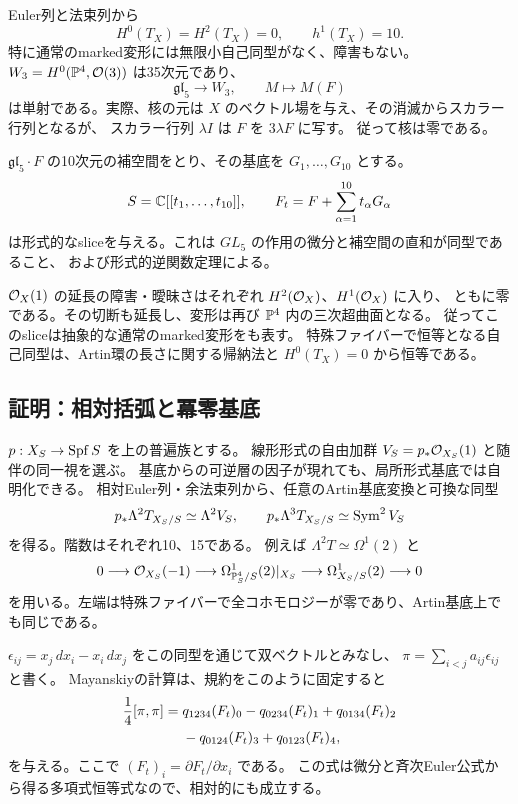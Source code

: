 Euler列と法束列から
\[
 H^0(T_X)=H^2(T_X)=0,\qquad h^1(T_X)=10.
\]
特に通常のmarked変形には無限小自己同型がなく、障害もない。
$W_3=H^0(\mathbb P^4,\mathcal O(3))$ は35次元であり、
\[
 \mathfrak{gl}_5\longrightarrow W_3,\qquad M\longmapsto M(F)
\]
は単射である。実際、核の元は $X$ のベクトル場を与え、その消滅からスカラー行列となるが、
スカラー行列 $\lambda I$ は $F$ を $3\lambda F$ に写す。
従って核は零である。

$\mathfrak{gl}_5\cdot F$ の10次元の補空間をとり、その基底を $G_1,\ldots,G_{10}$ とする。
\[
 S=\mathbb C[[t_1,\ldots,t_{10}]],\qquad
 F_t=F+\sum_{\alpha=1}^{10}t_\alpha G_\alpha
\]
は形式的なsliceを与える。これは $GL_5$ の作用の微分と補空間の直和が同型であること、
および形式的逆関数定理による。

$\mathcal O_X(1)$ の延長の障害・曖昧さはそれぞれ $H^2(\mathcal O_X)$、$H^1(\mathcal O_X)$ に入り、
ともに零である。その切断も延長し、変形は再び $\mathbb P^4$ 内の三次超曲面となる。
従ってこのsliceは抽象的な通常のmarked変形をも表す。
特殊ファイバーで恒等となる自己同型は、Artin環の長さに関する帰納法と
$H^0(T_X)=0$ から恒等である。

\subsection{証明：相対括弧と冪零基底}

$p:X_S\to\operatorname{Spf} S$ を上の普遍族とする。
線形形式の自由加群 $V_S=p_*\mathcal O_{X_S}(1)$ と随伴の同一視を選ぶ。
基底からの可逆層の因子が現れても、局所形式基底では自明化できる。
相対Euler列・余法束列から、任意のArtin基底変換と可換な同型
\[
 p_*\Lambda^2T_{X_S/S}\simeq\Lambda^2 V_S,\qquad
 p_*\Lambda^3T_{X_S/S}\simeq\operatorname{Sym}^2V_S
\]
を得る。階数はそれぞれ10、15である。
例えば $\Lambda^2T\simeq\Omega^1(2)$ と
\[
 0\longrightarrow\mathcal O_{X_S}(-1)
 \longrightarrow\Omega^1_{\mathbb P^4_S/S}(2)|_{X_S}
 \longrightarrow\Omega^1_{X_S/S}(2)\longrightarrow0
\]
を用いる。左端は特殊ファイバーで全コホモロジーが零であり、Artin基底上でも同じである。

$\epsilon_{ij}=x_j\,dx_i-x_i\,dx_j$ をこの同型を通じて双ベクトルとみなし、
$\pi=\sum_{i<j}a_{ij}\epsilon_{ij}$ と書く。
Mayanskiyの計算は、規約をこのように固定すると
\begin{align}
 \frac14[\pi,\pi]
 ={}&q_{1234}(F_t)_0-q_{0234}(F_t)_1+q_{0134}(F_t)_2 \notag\\
    &-q_{0124}(F_t)_3+q_{0123}(F_t)_4, \label{eq:bracket}
\end{align}
を与える。ここで $(F_t)_i=\partial F_t/\partial x_i$ である。
この式は微分と斉次Euler公式から得る多項式恒等式なので、相対的にも成立する。


